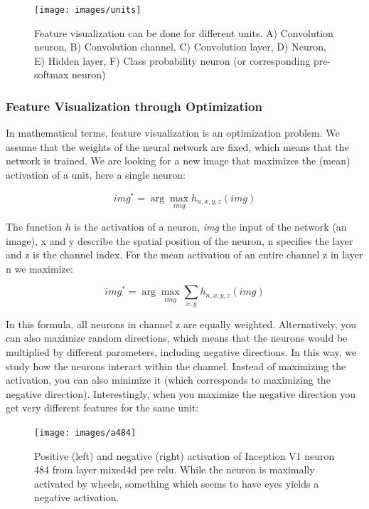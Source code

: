 \documentclass[
  10pt,
]{scrbook}
\begin{document}
\begin{figure}

{\centering \texttt{[image: images/units]} 

}

\caption{Feature visualization can be done for different units. A) Convolution neuron, B) Convolution channel, C) Convolution layer, D) Neuron, E) Hidden layer, F) Class probability neuron (or corresponding pre-softmax neuron)}\label{fig:units}
\end{figure}

\hypertarget{feature-visualization-through-optimization}{%
\subsubsection{Feature Visualization through Optimization}\label{feature-visualization-through-optimization}}

In mathematical terms, feature visualization is an optimization problem.
We assume that the weights of the neural network are fixed, which means that the network is trained.
We are looking for a new image that maximizes the (mean) activation of a unit, here a single neuron:

\[img^*=\arg\max_{img}h_{n,x,y,z}(img)\]

The function \(h\) is the activation of a neuron, \emph{img} the input of the network (an image), x and y describe the spatial position of the neuron, n specifies the layer and z is the channel index.
For the mean activation of an entire channel z in layer n we maximize:

\[img^*=\arg\max_{img}\sum_{x,y}h_{n,x,y,z}(img)\]

In this formula, all neurons in channel z are equally weighted.
Alternatively, you can also maximize random directions, which means that the neurons would be multiplied by different parameters, including negative directions.
In this way, we study how the neurons interact within the channel.
Instead of maximizing the activation, you can also minimize it (which corresponds to maximizing the negative direction).
Interestingly, when you maximize the negative direction you get very different features for the same unit:

\begin{figure}

{\centering \texttt{[image: images/a484]} 

}

\caption{Positive (left) and negative (right) activation of Inception V1 neuron 484 from layer mixed4d pre relu. While the neuron is maximally activated by wheels, something which seems to have eyes yields a negative activation.}\label{fig:pos-neg}
\end{figure}
\end{document}

